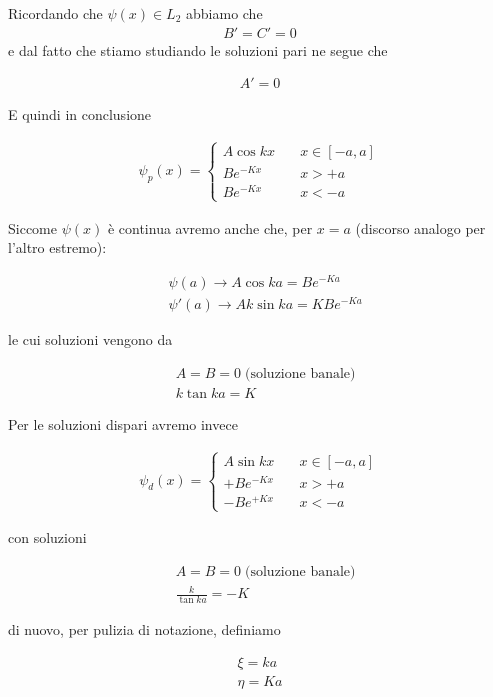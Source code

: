 Ricordando che $\psi(x)\in L_2$ abbiamo che
\begin{align}
B'= C'=0
\end{align}
e dal fatto che stiamo studiando le soluzioni pari ne segue che

\begin{align}
A'=0
\end{align}

E quindi in conclusione

\begin{align}
\psi_p(x)=
\left\{
\begin{array}{ccc}
A\cos{kx} \quad {}&x\in [-a,a] \\
Be^{-Kx} \quad &x>+a \\
Be^{-Kx} \quad &x<-a
\end{array} 
\right.
\end{align}

Siccome $\psi(x)$ è continua avremo anche che, per $x=a$ (discorso analogo per l'altro estremo):

\begin{align}
{}&\psi(a)\rightarrow A\cos{ka}= Be^{-Ka} \\
&\psi'(a)\rightarrow Ak\sin{ka}= KBe^{-Ka}
\end{align}

le cui soluzioni vengono da

\begin{align}
{}&A=B=0 \; \text{(soluzione banale)}\\
&k\tan{ka}=K
\end{align}


\newpage
Per le soluzioni dispari avremo invece

\begin{align}
\psi_d(x)=
\left\{
\begin{array}{ccc}
A\sin{kx} \quad {}&x\in [-a,a] \\
+Be^{-Kx} \quad &x>+a \\
-Be^{+Kx} \quad &x<-a
\end{array} 
\right.
\end{align}

con soluzioni

\begin{align}
{}&A=B=0 \; \text{(soluzione banale)}\\
&\frac{k}{\tan{ka}}=-K
\end{align}
 
di nuovo, per pulizia di notazione, definiamo

\begin{align}
\xi=ka \\
\eta= Ka
\end{align}

